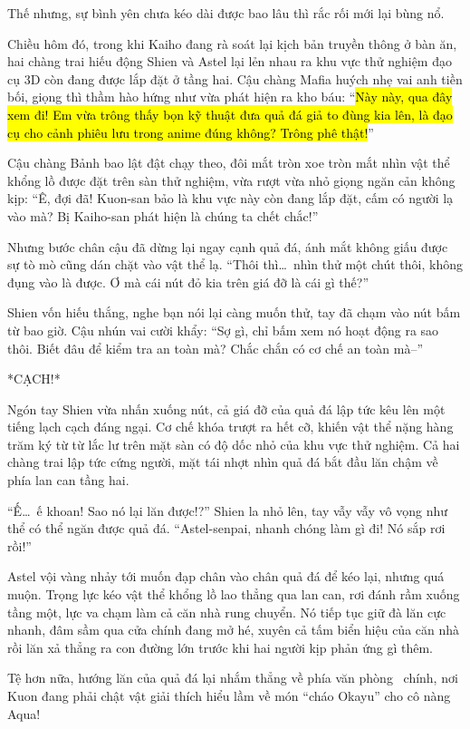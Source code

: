 \documentclass[../main.tex]{subfiles}
\begin{document}
Thế nhưng, sự bình yên chưa kéo dài được bao lâu thì rắc rối mới lại bùng nổ.

Chiều hôm đó, trong khi Kaiho đang rà soát lại kịch bản truyền thông ở bàn ăn, hai chàng trai hiếu động Shien và Astel lại lẻn nhau ra khu vực thử nghiệm đạo cụ 3D còn đang được lắp đặt ở tầng hai. Cậu chàng Mafia huých nhẹ vai anh tiền bối, giọng thì thầm hào hứng như vừa phát hiện ra kho báu: ``\hl{Này này, qua đây xem đi! Em vừa trông thấy bọn kỹ thuật đưa quả đá giả to đùng kia lên, là đạo cụ cho cảnh phiêu lưu trong anime đúng không? Trông phê thật!}''

Cậu chàng Bảnh bao lật đật chạy theo, đôi mắt tròn xoe tròn mắt nhìn vật thể khổng lồ được đặt trên sàn thử nghiệm, vừa rượt vừa nhỏ giọng ngăn cản không kịp: ``Ê, đợi đã! Kuon-san bảo là khu vực này còn đang lắp đặt, cấm có người lạ vào mà? Bị Kaiho-san phát hiện là chúng ta chết chắc!''

Nhưng bước chân cậu đã dừng lại ngay cạnh quả đá, ánh mắt không giấu được sự tò mò cũng dán chặt vào vật thể lạ. ``Thôi thì\dots\ nhìn thử một chút thôi, không đụng vào là được. Ơ mà cái nút đỏ kia trên giá đỡ là cái gì thế?''

Shien vốn hiếu thắng, nghe bạn nói lại càng muốn thử, tay đã chạm vào nút bấm từ bao giờ. Cậu nhún vai cười khẩy: ``Sợ gì, chỉ bấm xem nó hoạt động ra sao thôi. Biết đâu để kiểm tra an toàn mà? Chắc chắn có cơ chế an toàn mà--''

*CẠCH!*

Ngón tay Shien vừa nhấn xuống nút, cả giá đỡ của quả đá lập tức kêu lên một tiếng lạch cạch đáng ngại. Cơ chế khóa trượt ra hết cỡ, khiến vật thể nặng hàng trăm ký từ từ lắc lư trên mặt sàn có độ dốc nhỏ của khu vực thử nghiệm. Cả hai chàng trai lập tức cứng người, mặt tái nhợt nhìn quả đá bắt đầu lăn chậm về phía lan can tầng hai.

``Ế\dots\ ế khoan! Sao nó lại lăn được!?'' Shien la nhỏ lên, tay vẫy vẫy vô vọng như thể có thể ngăn được quả đá. ``Astel-senpai, nhanh chóng làm gì đi! Nó sắp rơi rồi!''

Astel vội vàng nhảy tới muốn đạp chân vào chân quả đá để kéo lại, nhưng quá muộn. Trọng lực kéo vật thể khổng lồ lao thẳng qua lan can, rơi đánh rầm xuống tầng một, lực va chạm làm cả căn nhà rung chuyển. Nó tiếp tục giữ đà lăn cực nhanh, đâm sầm qua cửa chính đang mở hé, xuyên cả tấm biển hiệu của căn nhà rồi lăn xả thẳng ra con đường lớn trước khi hai người kịp phản ứng gì thêm.

Tệ hơn nữa, hướng lăn của quả đá lại nhắm thẳng về phía văn phòng \hll\ chính, nơi Kuon đang phải chật vật giải thích hiểu lầm về món ``cháo Okayu'' cho cô nàng Aqua!
\end{document}
